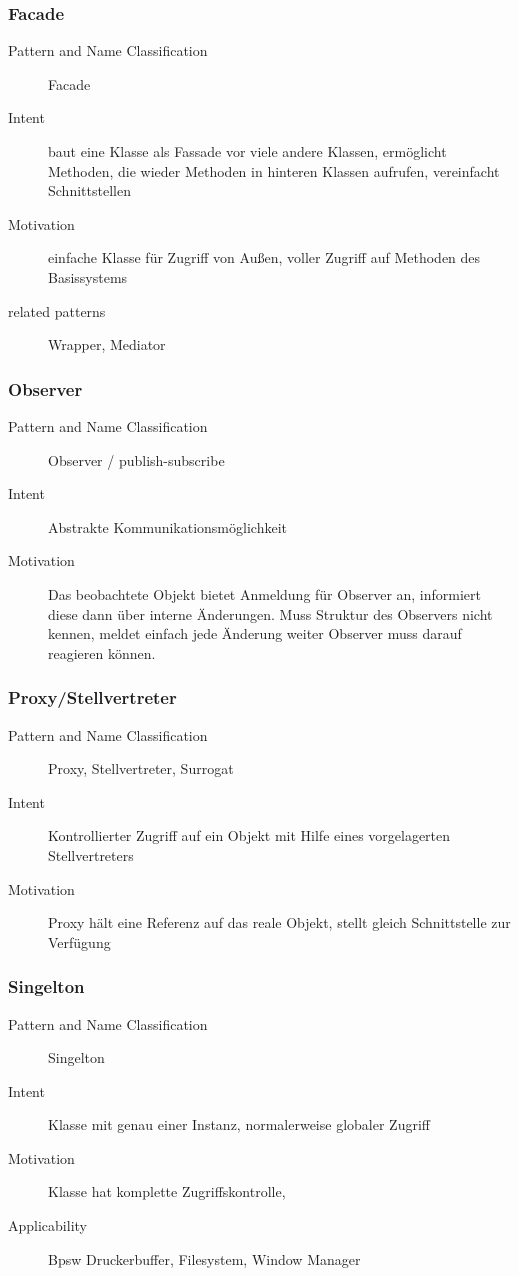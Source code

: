 \documentclass[a4paper, 10pt]{article}
\begin{document}
\subsubsection{Facade}
\begin{description}
	\item[Pattern and Name Classification] Facade
	\item[Intent] baut eine Klasse als Fassade vor viele andere Klassen, ermöglicht Methoden, die wieder Methoden in hinteren Klassen aufrufen, vereinfacht Schnittstellen
	\item[Motivation] einfache Klasse für Zugriff von Außen, voller Zugriff auf Methoden des Basissystems
	\item[related patterns] Wrapper, Mediator
\end{description}

\subsubsection{Observer}
\begin{description}
	\item[Pattern and Name Classification] Observer / publish-subscribe
	\item[Intent] Abstrakte Kommunikationsmöglichkeit
	\item[Motivation] Das beobachtete Objekt bietet Anmeldung für Observer an, informiert diese dann über interne Änderungen. Muss Struktur des Observers nicht kennen, meldet einfach jede Änderung weiter \follows Observer muss darauf reagieren können.
\end{description}

\subsubsection{Proxy/Stellvertreter}
\begin{description}
	\item[Pattern and Name Classification]Proxy, Stellvertreter, Surrogat
	\item[Intent] Kontrollierter Zugriff auf ein Objekt mit Hilfe eines vorgelagerten Stellvertreters
	\item[Motivation] Proxy hält eine Referenz auf das reale Objekt, stellt gleich Schnittstelle zur Verfügung
	
\end{description}

\subsubsection{Singelton}
\begin{description}
	\item[Pattern and Name Classification] Singelton
	\item[Intent] Klasse mit genau einer Instanz, normalerweise globaler Zugriff
	\item[Motivation] Klasse hat komplette Zugriffskontrolle, 
	\item[Applicability] Bpsw Druckerbuffer, Filesystem, Window Manager
\end{description}
\end{document}
